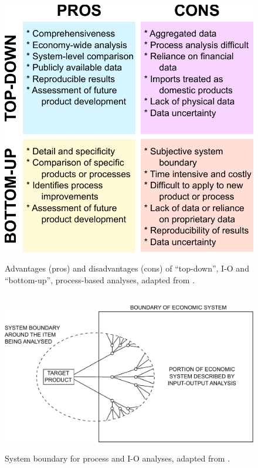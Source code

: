 \begin{figure}[h!]
\centering\
\includegraphics[width=0.8\linewidth]{Part_3/Chapter_Unfinished/images/Top_down_vs_bottom_up.pdf}
\caption[Top-down vs.\ bottom-up analyses ]{Advantages (pros) and disadvantages (cons) of ``top-down'', I-O and ``bottom-up'', process-based analyses, adapted from \cite{Hendrickson2006}.}
\label{fig:IO_vs_process}
\end{figure}

\begin{figure}[h!]
\centering\
\includegraphics[width=\linewidth]{Part_3/Chapter_Unfinished/images/Hybrid_boundary.pdf}
\caption[System boundary for process and I-O analyses]{System boundary for process and I-O analyses, adapted from \cite{Bullard:1978vd}.}
\label{fig:Hybrid_boundary}
\end{figure}


